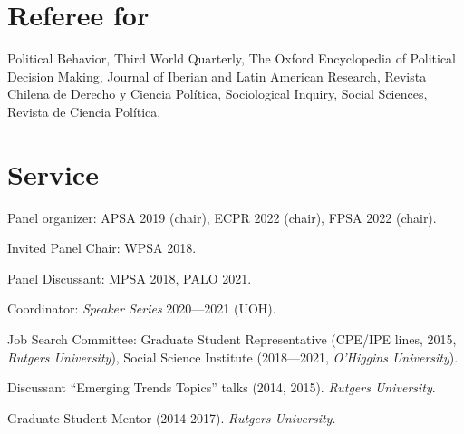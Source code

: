 \documentclass[letterpaper]{article}
\renewenvironment{itemize}{
  \begin{list}{}{
    \setlength{\leftmargin}{1.5em}
  }
}{
  \end{list}
}
\begin{document}

\section*{Referee for}
  \begin{itemize}
    \item[\textcolor{gray}{\textbullet}] Political Behavior, Third World Quarterly, The Oxford Encyclopedia of Political Decision Making, Journal of Iberian and Latin American Research, Revista Chilena de Derecho y Ciencia Pol\'itica, Sociological Inquiry, Social Sciences, Revista de Ciencia Pol\'itica.
  \end{itemize}




\section*{Service}

\begin{itemize}
\item[\textcolor{gray}{\textbullet}] Panel organizer: APSA 2019 (chair), ECPR 2022 (chair), FPSA 2022 (chair).
\item[\textcolor{gray}{\textbullet}] Invited Panel Chair: WPSA 2018.
\item[\textcolor{gray}{\textbullet}] Panel Discussant: MPSA 2018, \href{https://paloresearch.fi/en/events/finalconference/}{PALO} 2021.
\item[\textcolor{gray}{\textbullet}] Coordinator: \emph{Speaker Series} 2020---2021 (UOH).
\item[\textcolor{gray}{\textbullet}] Job Search Committee: Graduate Student Representative (CPE/IPE lines, 2015, \emph{Rutgers University}), Social Science Institute (2018---2021, \emph{O'Higgins University}).
\item[\textcolor{gray}{\textbullet}] Discussant ``Emerging Trends Topics'' talks (2014, 2015). \emph{Rutgers University}.
\item[\textcolor{gray}{\textbullet}] Graduate Student Mentor (2014-2017). \emph{Rutgers University}.
\end{itemize}


\end{document}
